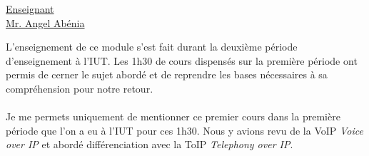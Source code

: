 \renewcommand{\figurename}{}

\vspace*{0.2cm}%
      \large
      \href{\@orientadorPagina}{\color{black}Enseignant\\Mr. Angel Abénia}\\%
\vspace*{0.5cm}%

L'enseignement de ce module s'est fait durant la deuxième période d'enseignement à l'IUT. Les 1h30 de cours dispensés sur la première période ont permis de cerner le sujet abordé et de reprendre les bases nécessaires à sa compréhension pour notre retour.
\\ \\
Je me permets uniquement de mentionner ce premier cours dans la première période que l'on a eu à l'IUT pour ces 1h30. Nous y avions revu de la VoIP \textit{Voice over IP} et abordé différenciation avec la ToIP \textit{Telephony over IP}.